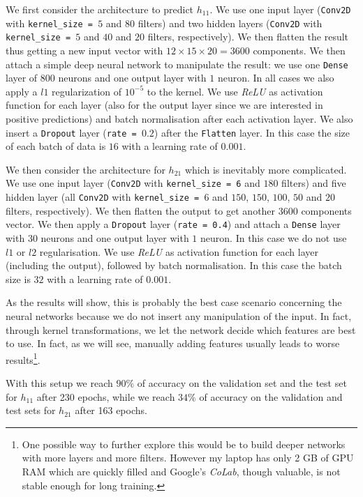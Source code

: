         We first consider the architecture to predict $h_{11}$. We use one input layer (\texttt{Conv2D} with \texttt{kernel\_size = $5$} and $80$ filters) and two hidden layers (\texttt{Conv2D} with \texttt{kernel\_size = $5$} and $40$ and $20$ filters, respectively). We then flatten the result thus getting a new input vector with $12 \times 15 \times 20 = 3600$ components. We then attach a simple deep neural network to manipulate the result: we use one \texttt{Dense} layer of $800$ neurons and one output layer with $1$ neuron. In all cases we also apply a $l1$ regularization of $10^{-5}$ to the kernel. We use \textit{ReLU} as activation function for each layer (also for the output layer since we are interested in positive predictions) and batch normalisation after each activation layer. We also insert a \texttt{Dropout} layer (\texttt{rate = $0.2$}) after the \texttt{Flatten} layer. In this case the size of each batch of data is $16$ with a learning rate of $0.001$.
        
        We then consider the architecture for $h_{21}$ which is inevitably more complicated. We use one input layer (\texttt{Conv2D} with \texttt{kernel\_size = 6} and $180$ filters) and five hidden layer (all \texttt{Conv2D} with \texttt{kernel\_size = $6$} and $150$, $150$, $100$, $50$ and $20$ filters, respectively). We then flatten the output to get another $3600$ components vector. We then apply a \texttt{Dropout} layer (\texttt{rate = 0.4}) and attach a \texttt{Dense} layer with $30$ neurons and one output layer with $1$ neuron. In this case we do not use $l1$ or $l2$ regularisation. We use \textit{ReLU} as activation function for each layer (including the output), followed by batch normalisation. In this case the batch size is $32$ with a learning rate of $0.001$.
        
        As the results will show, this is probably the best case scenario concerning the neural networks because we do not insert any manipulation of the input. In fact, through kernel transformations, we let the network decide which features are best to use. In fact, as we will see, manually adding features usually leads to worse results\footnote{One possible way to further explore this would be to build deeper networks with more layers and more filters. However my laptop has only 2 GB of GPU RAM which are quickly filled and Google's \textit{CoLab}, though valuable, is not stable enough for long training.}.
        
        With this setup we reach $90\%$ of accuracy on the validation set and the test set for $h_{11}$ after 230 epochs, while we reach $34\%$ of accuracy on the validation and test sets for $h_{21}$ after 163 epochs.
    
